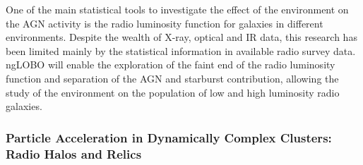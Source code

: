 \documentclass[11pt]{article}
\begin{document}
One of the main statistical tools to investigate the effect of the environment on the
AGN activity is the radio luminosity function for galaxies in different environments. 
Despite the wealth of X-ray, optical and IR data, this research has been limited 
mainly by the statistical information in available radio survey data. ngLOBO 
will enable the exploration of the faint end of the radio luminosity function 
and separation of the AGN and starburst contribution, allowing the study of the
environment on the population of low and high luminosity radio galaxies. 






\subsubsection{Particle Acceleration in Dynamically Complex Clusters: Radio Halos and Relics}
\end{document}
